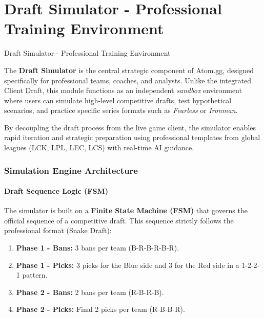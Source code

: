 \documentclass[12pt, a4paper]{article}
\renewcommand{\headrulewidth}{0.4pt}
\begin{document}
    \part{Draft Simulator - Professional Training Environment}
    \pagestyle{fancy}
    \fancyhf{} %
    \renewcommand{\headrulewidth}{0.4pt}
    \thispagestyle{empty}
    \vspace*{1cm}
    \begin{center}
        \LARGE
        Draft Simulator - Professional Training Environment

        \vfill

        \begin{minipage}{0.8\textwidth}
            \normalsize
            \noindent The \textbf{Draft Simulator} is the central strategic component of Atom.gg, designed specifically for professional teams, coaches, and analysts. Unlike the integrated Client Draft, this module functions as an independent \textit{sandbox} environment where users can simulate high-level competitive drafts, test hypothetical scenarios, and practice specific series formats such as \textit{Fearless} or \textit{Ironman}.

            By decoupling the draft process from the live game client, the simulator enables rapid iteration and strategic preparation using professional templates from global leagues (LCK, LPL, LEC, LCS) with real-time AI guidance.
        \end{minipage}

        \vspace{2cm}
    \end{center}
    \newpage

    \section{Simulation Engine Architecture}

    \subsection{Draft Sequence Logic (FSM)}
    The simulator is built on a \textbf{Finite State Machine (FSM)} that governs the official sequence of a competitive draft. This sequence strictly follows the professional format (Snake Draft):
    \begin{enumerate}
        \item \textbf{Phase 1 - Bans:} 3 bans per team (B-R-B-R-B-R).
        \item \textbf{Phase 1 - Picks:} 3 picks for the Blue side and 3 for the Red side in a 1-2-2-1 pattern.
        \item \textbf{Phase 2 - Bans:} 2 bans per team (R-B-R-B).
        \item \textbf{Phase 2 - Picks:} Final 2 picks per team (R-B-B-R).
    \end{enumerate}
\end{document}
